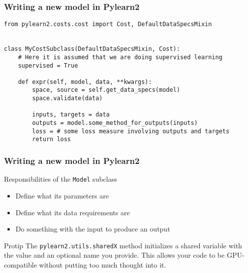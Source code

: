 \documentclass[mathserif, xcolor=dvipsnames]{beamer}
\begin{document}
\begin{frame}[fragile]
    \frametitle{Writing a new model in Pylearn2}
    \begin{examples}
\begin{lstlisting}[caption=Cost subclass implementation mockup]
from pylearn2.costs.cost import Cost, DefaultDataSpecsMixin


class MyCostSubclass(DefaultDataSpecsMixin, Cost):
    # Here it is assumed that we are doing supervised learning
    supervised = True

    def expr(self, model, data, **kwargs):
        space, source = self.get_data_specs(model)
        space.validate(data)

        inputs, targets = data
        outputs = model.some_method_for_outputs(inputs)
        loss = # some loss measure involving outputs and targets
        return loss
\end{lstlisting}
    \end{examples}
\end{frame}

\begin{frame}[fragile]
    \frametitle{Writing a new model in Pylearn2}
    \begin{block}{Responsibilities of the \texttt{Model} subclass}
    \begin{itemize}
        \item{Define what its parameters are}
        \item{Define what its data requirements are}
        \item{Do something with the input to produce an output}
    \end{itemize}
    \end{block}

    \begin{alertblock}{Protip}
    The \texttt{pylearn2.utils.sharedX} method initializes a shared variable
    with the value and an optional name you provide. This allows your code to
    be GPU-compatible without putting too much thought into it.
    \end{alertblock}
\end{frame}
\end{document}
